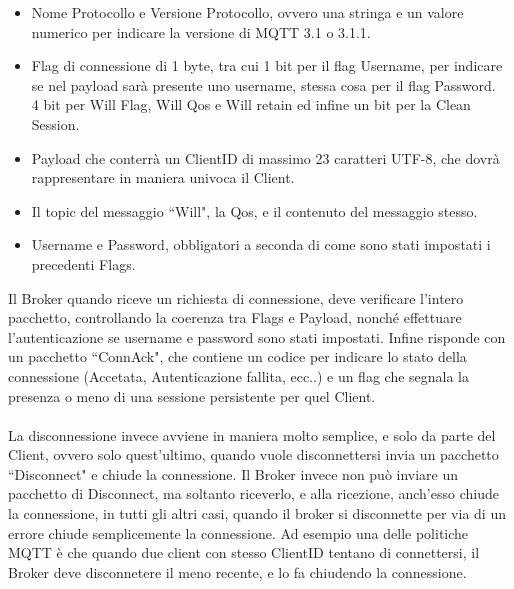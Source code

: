 \documentclass{article}
\begin{document}
\begin{itemize}
	\item Nome Protocollo e Versione Protocollo, ovvero una stringa e un valore numerico per indicare la versione di MQTT 3.1 o 3.1.1.
	\item Flag di connessione di 1 byte, tra cui 1 bit per il flag Username, per indicare se nel payload sarà presente uno username, stessa cosa per il flag Password.\\4 bit per Will Flag, Will Qos e Will retain ed infine un bit per la Clean Session. 
	\item Payload che conterrà un ClientID di massimo 23 caratteri UTF-8, che dovrà rappresentare in maniera univoca il Client.
	\item Il topic del messaggio ``Will", la Qos, e il contenuto del messaggio stesso.
	\item Username e Password, obbligatori a seconda di come sono stati impostati i precedenti Flags.
\end{itemize}
Il Broker quando riceve un richiesta di connessione, deve verificare l'intero pacchetto, controllando la coerenza tra Flags e Payload, nonché effettuare l'autenticazione se username e password sono stati impostati. Infine risponde con un pacchetto ``ConnAck", che contiene un codice per indicare lo stato della connessione (Accetata, Autenticazione fallita, ecc..) e un flag che segnala la presenza o meno di una sessione persistente per quel Client.\\\\La disconnessione invece avviene in maniera molto semplice, e solo da parte del Client, ovvero solo quest'ultimo, quando vuole disconnettersi invia un pacchetto ``Disconnect" e chiude la connessione. Il Broker invece non può inviare un pacchetto di Disconnect, ma soltanto riceverlo, e alla ricezione, anch'esso chiude la connessione, in tutti gli altri casi, quando il broker si disconnette per via di un errore chiude semplicemente la connessione. Ad esempio una delle politiche MQTT è che quando due client con stesso ClientID tentano di connettersi, il Broker deve disconnetere il meno recente, e lo fa chiudendo la connessione.
\end{document}

